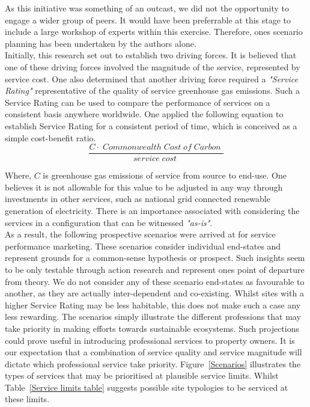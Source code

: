 \documentclass[12pt, oneside]{article}   	%
\begin{document}
As this initiative was something of an outcast, we did not the opportunity to engage a wider group of peers.
It would have been preferrable at this stage to include a large workshop of experts within this exercise.
Therefore, ones scenario planning has been undertaken by the authors alone.\\

Initially, this research set out to establish two driving forces.
It is believed that one of these driving forces involved the magnitude of the service, represented by service cost.
One also determined that another driving force required a \emph{"Service Rating"} representative of the quality of service greenhouse gas emissions.
Such a Service Rating can be used to compare the performance of services on a consistent basis anywhere worldwide.
One applied the following equation to establish Service Rating for a consistent period of time, which is conceived as a simple cost-benefit ratio.\\

\begin{equation}
	\frac{C  \cdot \;Commonwealth\; Cost\; of\; Carbon\;}{service\; cost\;}
\end{equation}

Where, $C$ is greenhouse gas emissions of service from source to end-use.
One believes it is not allowable for this value to be adjusted in any way through investments in other services, such as national grid connected renewable generation of electricity.
There is an importance associated with considering the services in a configuration that can be witnessed \emph{"as-is"}.\\

As a result, the following prospective scenarios were arrived at for service performance marketing.
These scenarios consider individual end-states and represent grounds for a common-sense hypothesis or prospect.
Such insights seem to be only testable through action research and represent ones point of departure from theory.
We do not consider any of these scenario end-states as favourable to another, as they are actually inter-dependent and co-existing.
Whilst sites with a higher Service Rating may be less habitable, this does not make such a case any less rewarding.
The scenarios simply illustrate the different professions that may take priority in making efforts towards sustainable ecosystems.
Such projections could prove useful in introducing professional services to property owners.
It is our expectation that a combination of service quality and service magnitude will dictate which professional service take priority.
Figure~\ref{Scenarios} illustrates the types of services that may be prioritised at plausible service limits.
Whilst Table~\ref{Service limits table} suggests possible site typologies to be serviced at these limits.\\
\end{document}
